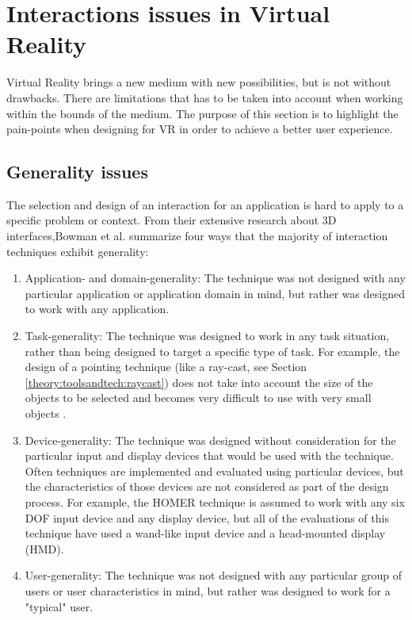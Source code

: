 \section{Interactions issues in Virtual Reality}
\label{theory:interactionissues}
Virtual Reality brings a new medium with new possibilities, but is not without drawbacks. There are limitations that has to be taken into account when working within the bounds of the medium. The purpose of this section is to highlight the pain-points when designing for VR in order to achieve a better user experience.

\subsection{Generality issues}
The selection and design of an interaction for an application is hard to apply to a specific problem or context. From their extensive research about 3D interfaces,Bowman et al. \cite{interactions:Bowman2006} summarize four ways that the majority of interaction techniques exhibit generality:
\begin{enumerate}
  \item Application- and domain-generality: The technique was not designed with any particular application or application domain in mind, but rather was designed to work with any application.
  \item Task-generality: The technique was designed to work in any task situation, rather than being designed to target a specific type of task. For example, the design of a pointing technique (like a ray-cast, see Section \ref{theory:toolsandtech:raycast}) does not take into account the size of the objects to be selected and becomes very difficult to use with very small objects \cite{interaction:Poupyrev1997}.
  \item Device-generality: The technique was designed without consideration for the particular input and display devices that would be used with the technique. Often techniques are implemented and evaluated using particular devices, but the characteristics of those devices are not considered as part of the design process. For example, the HOMER technique\cite{interactions:Bowman1997} is assumed to work with any six DOF input device and any display device, but all of the evaluations of this technique have used a wand-like input device and a head-mounted display (HMD).
  \item User-generality: The technique was not designed with any particular group of users or user characteristics in mind, but rather was designed to work for a "typical" user.
\end{enumerate}

